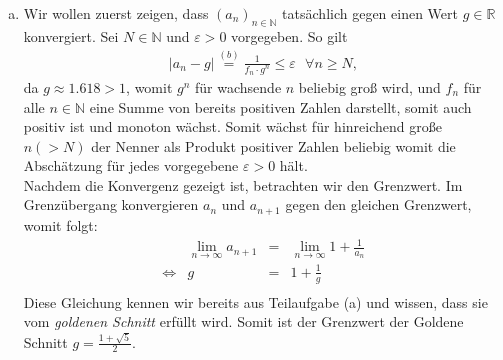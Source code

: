 \documentclass{scrreprt}
\newcommand{\NN}{\mathbb{N}}
\newcommand{\RR}{\mathbb{R}}
\begin{document}
\begin{enumerate}[(a)]
\begin{proof}
                \begin{align*}
                    \left\vert a_{n+1} - g \right\vert =  & \left\vert 1 + \frac{1}{a_n} - 1 - \frac{1}{g} \right\vert ~~~ \text{nach (a)} &\\
                    = & \left\vert \frac{1}{a_{n}} - \frac{1}{g} \right\vert&\\
                    = & \left\vert \frac{g - a_n}{a_{n} \cdot g} \right\vert&\\
                    = & \frac{a_n - g}{a_n \cdot g}&\\
                    \overset{IV}{=} & \frac{\frac{1}{f_n \cdot g^n}}{a_n \cdot g}&\\
                    = & \frac{1}{f_n \cdot g^{n+1} \cdot a_n} & =  \frac{1}{f_{n+1} \cdot g^{n+1} }
                \end{align*}
            \end{proof}
        \item
        	Wir wollen zuerst zeigen, dass $(a_n)_{n \in \NN}$ tatsächlich gegen einen Wert $g \in \RR$ konvergiert. Sei $N \in \NN$ und $\varepsilon > 0 $ vorgegeben. So gilt
        	\begin{align*}
        		\left\vert a_n - g\right\vert \overset{(b)}{=} \frac{1}{f_n \cdot g^n} \leq \varepsilon ~~~ \forall n \geq N,
        	\end{align*}
        	da $g \approx 1.618 > 1$, womit $g^n$ für wachsende $n$ beliebig groß wird, und $f_n$ für alle $n \in \NN$ eine Summe von bereits positiven Zahlen darstellt, somit auch positiv ist und monoton wächst. Somit wächst für hinreichend große $n (>N)$ der Nenner als Produkt positiver Zahlen beliebig womit die Abschätzung für jedes vorgegebene $\varepsilon >0$ hält.\\
        	Nachdem die Konvergenz gezeigt ist, betrachten wir den Grenzwert. Im Grenzübergang konvergieren $a_n$ und $a_{n+1}$ gegen den gleichen Grenzwert, womit folgt:
        	\begin{align*}
        		& \lim\limits_{n \to \infty} a_{n+1} & = & \lim\limits_{n \to \infty} 1 + \frac{1}{a_n}\\
        		\Leftrightarrow & g & = & 1 + \frac{1}{g}\\
        	\end{align*}
        	Diese Gleichung kennen wir bereits aus Teilaufgabe (a) und wissen, dass sie vom \emph{goldenen Schnitt} erfüllt wird. Somit ist der Grenzwert der Goldene Schnitt $g = \frac{1 + \sqrt{5}}{2}$.
	\end{enumerate}
\end{document}
